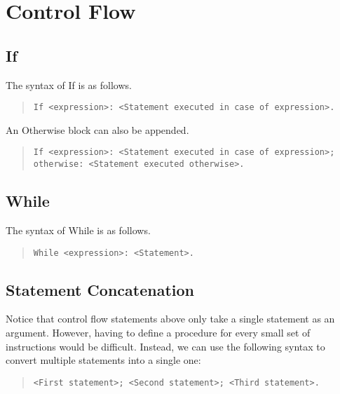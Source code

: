 \documentclass{article}
\newcommand{\code}[1]{\texttt{#1}}
\newcommand{\codeblock}[1]{\begin{quote}\code{#1}\end{quote}}
\begin{document}
\section{Control Flow}
\subsection{If}
The syntax of If is as follows.
\codeblock{If <expression>: <Statement executed in case of expression>.}
An Otherwise block can also be appended.
\codeblock{If <expression>: <Statement executed in case of expression>; otherwise: <Statement executed otherwise>.}
\subsection{While}
The syntax of While is as follows.
\codeblock{While <expression>: <Statement>.}
\subsection{Statement Concatenation}
Notice that control flow statements above only take a single statement as an argument. However, having to define a procedure for every small set of instructions would be difficult. Instead, we can use the following syntax to convert multiple statements into a single one:
\codeblock{<First statement>; <Second statement>; <Third statement>.}
\end{document}
